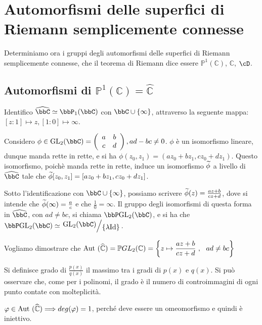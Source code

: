 \chapter{Automorfismi delle superfici di Riemann semplicemente connesse}

Determiniamo ora i gruppi degli automorfismi delle superfici di Riemann semplicemente
connesse, che il teorema di Riemann dice essere $\mathbb{P}^1(\mathbb{C})$, $\mathbb{C}$, $\cD$.


\section{Automorfismi di $\mathbb{P}^1(\mathbb{C})=\hat{\mathbb{C}}$}

Identifico $\oc\bbC\isom\bbP_1(\bbC)$ con $\bbC\cup\{\infty\}$, attraverso la seguente mappa: $[z:1]\mapsto z, [1:0]\mapsto\infty$.

Considero $\phi\in\GL_2(\bbC)=\matrice abcd, ad-bc \neq 0$. $\phi$ è un isomorfismo lineare, dunque manda rette in rette, e si ha $\phi(z_0,z_1)=(az_0+bz_1,cz_0+dz_1)$. Questo isomorfismo, poichè manda rette in rette, induce un isomorfismo $\widetilde{\phi}$ a livello di $\oc\bbC$ tale che $\widetilde{\phi}[z_0,z_1]=[az_0+bz_1,cz_0+dz_1]$.

Sotto l'identificazione con $\bbC\cup\{\infty\}$, possiamo scrivere $\widetilde{\phi}(z)=\frac{az+b}{cz+d}$, dove si intende che $\widetilde{\phi}(\infty)=\frac{a}{c}$ e che $\frac{1}{0}=\infty$. Il gruppo degli isomorfismi di questa forma in $\oc \bbC$, con $ad\neq bc$, si chiama $\bbP\GL_2(\bbC)$, e si ha che $\bbP\GL_2(\bbC)\isom\quotient{\GL_2(\bbC)}{\{\lambda\Id\}}$.

Vogliamo dimostrare che $\text{Aut }( \widehat{\mathbb{C}} )= \mathbb{P}GL_2 (\mathbb{C} )=\left\{z\mapsto \displaystyle{\frac{az+b}{cz+d}} \ ,\ \  ad\neq bc\right\}$

\begin{definizione}
Si definisce grado di $\frac{p(x)}{q(x)}$ il massimo tra i gradi di $p(x)$ e $q(x)$.
Si può osservare che, come per i polinomi, il grado è il numero di controimmagini di ogni punto contate con molteplicità.
\end{definizione}

\begin{osservazione}
$\varphi \in \text{Aut }( \widehat{\mathbb{C}} ) \Longrightarrow deg(\varphi )=1$, perché deve essere un omeomorfismo e quindi è iniettivo.
\end{osservazione}


